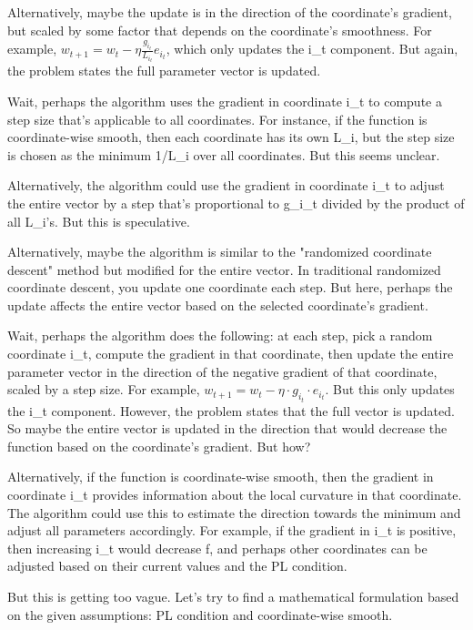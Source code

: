 \documentclass{article}
\begin{document}
Alternatively, maybe the update is in the direction of the coordinate's gradient, but scaled by some factor that depends on the coordinate's smoothness. For example, \( w_{t+1} = w_t - \eta \frac{g_{i_t}}{L_{i_t}} e_{i_t} \), which only updates the i_t component. But again, the problem states the full parameter vector is updated.

Wait, perhaps the algorithm uses the gradient in coordinate i_t to compute a step size that's applicable to all coordinates. For instance, if the function is coordinate-wise smooth, then each coordinate has its own L_i, but the step size is chosen as the minimum 1/L_i over all coordinates. But this seems unclear.

Alternatively, the algorithm could use the gradient in coordinate i_t to adjust the entire vector by a step that's proportional to g_{i_t} divided by the product of all L_i's. But this is speculative.

Alternatively, maybe the algorithm is similar to the "randomized coordinate descent" method but modified for the entire vector. In traditional randomized coordinate descent, you update one coordinate each step. But here, perhaps the update affects the entire vector based on the selected coordinate's gradient.

Wait, perhaps the algorithm does the following: at each step, pick a random coordinate i_t, compute the gradient in that coordinate, then update the entire parameter vector in the direction of the negative gradient of that coordinate, scaled by a step size. For example, \( w_{t+1} = w_t - \eta \cdot g_{i_t} \cdot e_{i_t} \). But this only updates the i_t component. However, the problem states that the full vector is updated. So maybe the entire vector is updated in the direction that would decrease the function based on the coordinate's gradient. But how?

Alternatively, if the function is coordinate-wise smooth, then the gradient in coordinate i_t provides information about the local curvature in that coordinate. The algorithm could use this to estimate the direction towards the minimum and adjust all parameters accordingly. For example, if the gradient in i_t is positive, then increasing i_t would decrease f, and perhaps other coordinates can be adjusted based on their current values and the PL condition.

But this is getting too vague. Let's try to find a mathematical formulation based on the given assumptions: PL condition and coordinate-wise smooth.
\end{document}
